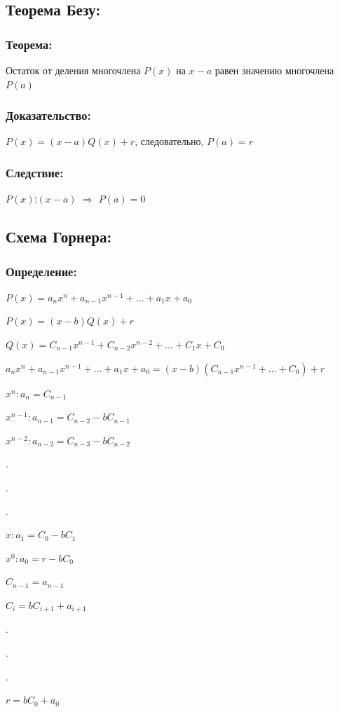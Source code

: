 \documentclass[12pt]{article}
\begin{document}
\subsection{Теорема Безу:}
\subsubsection{Теорема:}
Остаток от деления многочлена $P(x)$ на $x-a$ равен значению многочлена $P(a)$
\subsubsection{Доказательство:}
$P(x) = (x − a)Q(x) + r$, следовательно, $P(a) = r$
\subsubsection{Следствие:}
$P(x) \vdots (x − a)$ $\Rightarrow$ $P(a) = 0$
\subsection{Схема Горнера:}
\subsubsection{Определение:}
$P(x) = a_{n}x^{n} + a_{n-1}x^{n-1} + ... + a_{1}x + a_{0}$\par
$P(x)=(x-b)Q(x) + r$\par
$Q(x) = C_{n-1}x^{n-1} + C_{n-2}x^{n-2} + ... + C_{1}x + C_{0}$\par
$a_{n}x^{n} + a_{n-1}x^{n-1} + ... + a_{1}x + a_{0} = (x-b)(C_{n-1}x^{n-1} + ... + C_{0}) + r$\par
$x^{n}: a_{n} = C_{n-1}$\par
$x^{n-1}: a_{n-1} = C_{n-2} - bC_{n-1}$\par
$x^{n-2}: a_{n-2} = C_{n-3} - bC_{n-2}$\par
$.$\par
$.$\par
$.$\par
$x: a_{1} = C_{0} - bC_{1}$\par
$x^{0}: a_{0} = r - bC_{0}$\par
$C_{n-1} = a_{n-1}$\par
$C_{i} = bC_{i+1} + a_{i+1}$\par
$.$\par
$.$\par
$.$\par
$r = bC_{0} + a_{0}$\par
\end{document}

